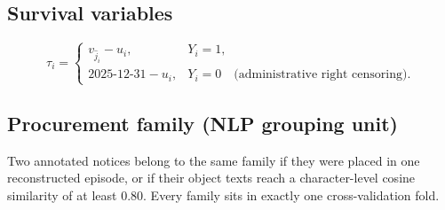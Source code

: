 \subsection*{Survival variables}

\[
\tau_i =
\begin{cases}
v_{\hat{j}_i} - u_i, & Y_i = 1,\\[2pt]
\text{2025-12-31} - u_i, & Y_i = 0 \quad \text{(administrative right censoring)}.
\end{cases}
\]

\subsection*{Procurement family (NLP grouping unit)}

Two annotated notices belong to the same family if they were placed in one reconstructed episode, or if
their object texts reach a character-level cosine similarity of at least $0.80$. Every family sits in exactly
one cross-validation fold.
